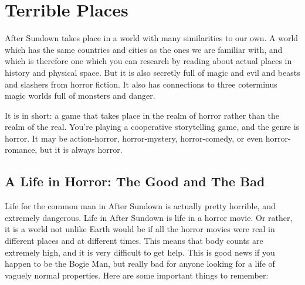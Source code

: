 \chapter{Terrible Places}

After Sundown takes place in a world with many similarities to our own. A world which has the same countries and cities as the ones we are familiar with, and which is therefore one which you can research by reading about actual places in history and physical space. But it is also secretly full of magic and evil and beasts and slashers from horror fiction. It also has connections to three coterminus magic worlds full of monsters and danger.

It is in short: a game that takes place in the realm of horror rather than the realm of the real. You're playing a cooperative storytelling game, and the genre is horror. It may be action-horror, horror-mystery, horror-comedy, or even horror-romance, but it is always horror.

\section[A Life In Horror]{A Life in Horror: The Good and The Bad}

Life for the common man in After Sundown is actually pretty horrible, and extremely dangerous. Life in After Sundown is life in a horror movie. Or rather, it is a world not unlike Earth would be if all the horror movies were real in different places and at different times. This means that body counts are extremely high, and it is very difficult to get help. This is good news if you happen to be the Bogie Man, but really bad for anyone looking for a life of vaguely normal properties. Here are some important things to remember:

